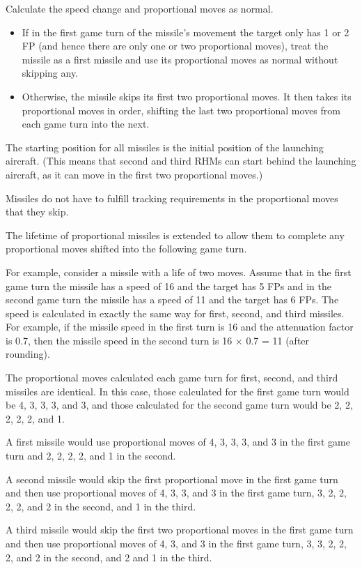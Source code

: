 {    Calculate the speed change and proportional moves as normal.
    \begin{itemize}
        \item If in the first game turn of the missile’s movement the target only has 1 or 2 FP (and hence there are only one or two proportional moves), treat the missile as a first missile and use its proportional moves as normal without skipping any.
        \item Otherwise, the missile skips its first two proportional moves. It then takes its proportional moves in order, shifting the last two proportional moves from each game turn into the next.
    \end{itemize}

    The starting position for all missiles is the initial position of the launching aircraft. (This means that second and third RHMs can start behind the launching aircraft, as it can move in the first two proportional moves.)

    Missiles do not have to fulfill tracking requirements in the proportional moves that they skip.

    The lifetime of proportional missiles is extended to allow them to complete any proportional moves shifted into the following game turn.

    For example, consider a missile with a life of two moves. Assume that in the first game turn the missile has a speed of 16 and the target has 5 FPs and in the second game turn the missile has a speed of 11 and the target has 6 FPs.
    The speed is calculated in exactly the same way for first, second, and third missiles. For example, if the missile speed in the first turn is 16 and the attenuation factor is 0.7, then the missile speed in the second turn is 16 × 0.7 = 11 (after rounding).

    The proportional moves calculated each game turn for first, second, and third missiles are identical. In this case, those calculated for the first game turn would be 4, 3, 3, 3, and 3, and those calculated for the second game turn would be 2, 2, 2, 2, 2, and 1.

    A first missile would use proportional moves of 4, 3, 3, 3, and 3 in the first game turn and 2, 2, 2, 2, and 1 in the second.

    A second missile would skip the first proportional move in the first game turn and then use proportional moves of 4, 3, 3, and 3 in the first game turn, 3, 2, 2, 2, 2, and 2 in the second, and 1 in the third.

    A third missile would skip the first two proportional moves in the first game turn and then use proportional moves of 4, 3,  and 3 in the first game turn, 3, 3, 2, 2, 2, and 2 in the second, and 2 and 1 in the third.

}

